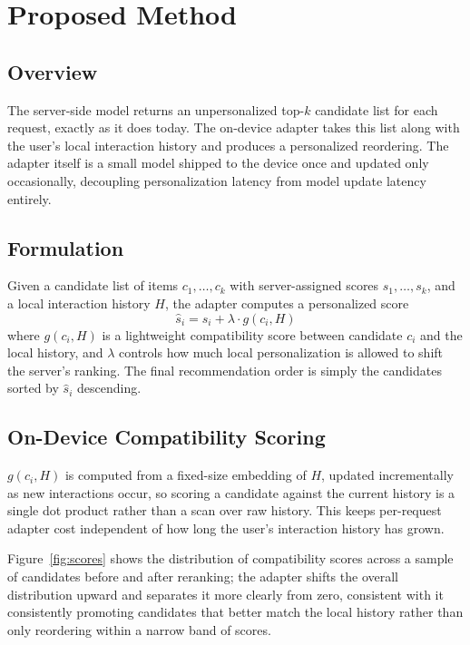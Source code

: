 \documentclass[sigconf]{acmart}
\begin{document}
\section{Proposed Method}
\subsection{Overview}
The server-side model returns an unpersonalized top-$k$ candidate list for each request, exactly as it does today. The on-device adapter takes this list along with the user's local interaction history and produces a personalized reordering. The adapter itself is a small model shipped to the device once and updated only occasionally, decoupling personalization latency from model update latency entirely.

\subsection{Formulation}
Given a candidate list of items $c_1, \dots, c_k$ with server-assigned scores $s_1, \dots, s_k$, and a local interaction history $H$, the adapter computes a personalized score
\begin{equation}
\hat{s}_i = s_i + \lambda \cdot g(c_i, H)
\label{eq:rerank}
\end{equation}
where $g(c_i, H)$ is a lightweight compatibility score between candidate $c_i$ and the local history, and $\lambda$ controls how much local personalization is allowed to shift the server's ranking. The final recommendation order is simply the candidates sorted by $\hat{s}_i$ descending.

\subsection{On-Device Compatibility Scoring}
$g(c_i, H)$ is computed from a fixed-size embedding of $H$, updated incrementally as new interactions occur, so scoring a candidate against the current history is a single dot product rather than a scan over raw history. This keeps per-request adapter cost independent of how long the user's interaction history has grown.

Figure~\ref{fig:scores} shows the distribution of compatibility scores across a sample of candidates before and after reranking; the adapter shifts the overall distribution upward and separates it more clearly from zero, consistent with it consistently promoting candidates that better match the local history rather than only reordering within a narrow band of scores.
\end{document}

